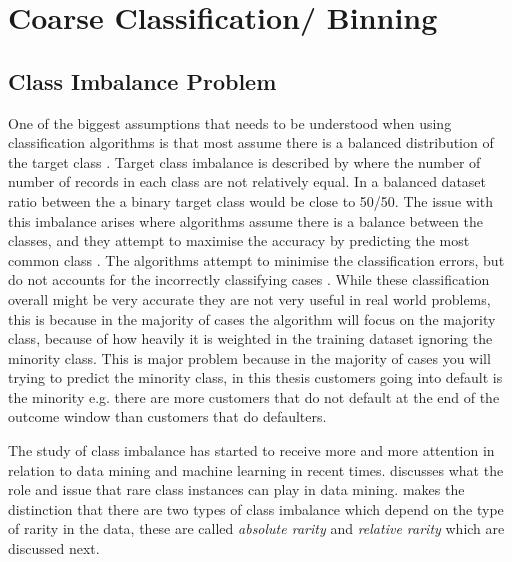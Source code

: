 \section{Coarse Classification/ Binning}

\begin{comment}
\subsection{Correlation-based Feature Selection}
\subsection{Information Gain}
\subsection{Coarse Classification/ Binning}
\end{comment}

\subsection{Class Imbalance Problem}
One of the biggest assumptions that needs to be understood when using classification algorithms is that most assume there is a balanced distribution of the target class \citep{japkowicz_class_2000}. Target class imbalance is described by  \citep{chawla_smote:_2002} where the number of number of records in each class are not relatively equal. In a balanced dataset ratio between the a binary target class would be close to 50/50. The issue with this imbalance arises where algorithms assume there is a balance between the classes, and they attempt to maximise the accuracy by predicting the most common class \citep{drummond_severe_2005}. The algorithms attempt to minimise the classification errors, but do not accounts for the incorrectly classifying cases \citep{seiffert_improving_2009}. While these classification overall might be very accurate they are not very useful in real world problems, this is because in the majority of cases the algorithm will focus on the majority class, because of how heavily it is weighted in the training dataset ignoring the minority class. This is major problem because in the majority of cases you will trying to predict the minority class, in this thesis customers going into default is the minority e.g. there are more customers that do not default at the end of the outcome window than customers that do defaulters.

The study of class imbalance has started to receive more and more attention in relation to data mining and machine learning in recent times. \cite{weiss_mining_2004} discusses what the role and issue that rare class instances can play in data mining. \cite{weiss_mining_2004} makes the distinction that there are two types of class imbalance which depend on the type of rarity in the data, these are called \textit{absolute rarity} and \textit{relative rarity} which are discussed next.


